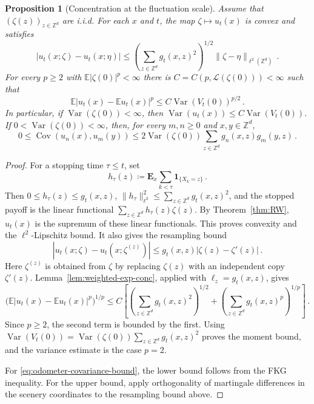 \documentclass[11pt]{amsart}
\theoremstyle{plain}
\newtheorem{proposition}[theorem]{Proposition}
\theoremstyle{definition}
\newcommand{\Z}{\mathbb{Z}}
\newcommand{\E}{\mathbb{E}}
\DeclareMathOperator{\Var}{Var}
\DeclareMathOperator{\Cov}{Cov}
\begin{document}
	\begin{proposition}[Concentration at the fluctuation scale]\label{prop:finite-time-concentration-scale}
		Assume that $(\zeta(z))_{z\in\Z^d}$ are i.i.d. For each $x$ and
		$t$, the map $\zeta\mapsto u_t(x)$ is convex and satisfies
		\[
			|u_t(x;\zeta)-u_t(x;\eta)|
			\leq
			\left(\sum_{z\in\Z^d}g_t(x,z)^2\right)^{1/2}
			\|\zeta-\eta\|_{\ell^2(\Z^d)}\, .
		\]
		For every $p\geq2$ with $\E|\zeta(0)|^p<\infty$ there is
		$C=C(p,\mathcal L(\zeta(0)))<\infty$ such that
		\[
			\E\bigl|u_t(x)-\E u_t(x)\bigr|^p
			\leq C \Var(V_t(0))^{p/2}\, .
		\]
		In particular, if $\Var(\zeta(0))<\infty$, then
		$\Var(u_t(x))\leq C\Var(V_t(0))$.
		If $0<\Var(\zeta(0))<\infty$, then, for every $m,n\geq0$ and
		$x,y\in\Z^d$,
		\begin{equation}\label{eq:odometer-covariance-bound}
			0\leq\Cov(u_n(x),u_m(y))
			\leq
			2\Var(\zeta(0))
			\sum_{z\in\Z^d}g_n(x,z)g_m(y,z)\, .
		\end{equation}
	\end{proposition}

	\begin{proof}
		For a stopping time $\tau\leq t$, set
		\[
			h_\tau(z)\coloneqq \mathbf E_x\sum_{k<\tau}\mathbf 1_{\{X_k=z\}}\, .
		\]
		Then $0\leq h_\tau(z)\leq g_t(x,z)$,
		$\|h_\tau\|_{\ell^2}^2\leq \sum_{z\in\Z^d}g_t(x,z)^2$, and the stopped payoff is the
		linear functional $\sum_{z\in\Z^d} h_\tau(z)\zeta(z)$. By
		Theorem~\ref{thm:RW}, $u_t(x)$ is the supremum of these linear
		functionals. This proves convexity and the $\ell^2$-Lipschitz bound.
		It also gives the resampling bound
		\begin{equation}\label{eq:odometer-resampling}
			|u_t(x;\zeta)-u_t(x;\zeta^{(z)})|
			\leq g_t(x,z)|\zeta(z)-\zeta'(z)|\, .
		\end{equation}
		Here $\zeta^{(z)}$ is obtained from $\zeta$ by replacing $\zeta(z)$
		with an independent copy $\zeta'(z)$.
		Lemma~\ref{lem:weighted-exp-conc}, applied with
		$\ell_z=g_t(x,z)$, gives
		\[
			\bigl(\E\bigl|u_t(x)-\E u_t(x)\bigr|^p\bigr)^{1/p}
			\leq
			C\left[
			\left(\sum_{z\in\Z^d} g_t(x,z)^2\right)^{1/2}
			+
			\left(\sum_{z\in\Z^d} g_t(x,z)^p\right)^{1/p}
			\right]\, .
		\]
		Since $p\geq2$, the second term is bounded by the first. Using
		$\Var(V_t(0))=\Var(\zeta(0))\sum_{z\in\Z^d}g_t(x,z)^2$ proves the moment bound,
		and the variance estimate is the case $p=2$.

		For \eqref{eq:odometer-covariance-bound}, the lower bound follows from
		the FKG inequality. For the upper bound, apply orthogonality of
		martingale differences in the scenery coordinates to the resampling
		bound above.
	\end{proof}
\end{document}
